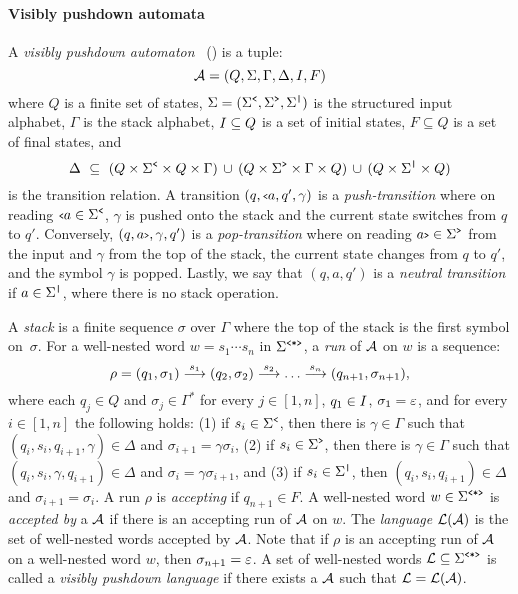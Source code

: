 \paragraph{Visibly pushdown automata} A \emph{visibly pushdown automaton}~\cite{AlurM04} (\vpa) is a tuple:
$$
\mathcal{A} = (Q, \Sigma, \Gamma, \Delta, I, F)
$$ 
where $Q$ is a finite set of states, $\Sigma = (\Sigma^{\texttt{<}}, \Sigma^{\texttt{>}}, \Sigma^{\texttt{|}})$ is the structured input alphabet, $\Gamma$ is the stack alphabet, $I \subseteq Q$ is a set of initial states, $F\subseteq Q$ is a set of final states, and
$$
\Delta \ \subseteq \ (Q\times\opS\times Q\times\Gamma) \,\cup \, (Q\times\clS\times\Gamma\times Q) \, \cup \, (Q\times\noS\times Q)
$$ 
is the transition relation.
A transition $(q,{\scriptsize\texttt{<}} a,q',\gamma)$ is a {\em push-transition} where on reading ${\scriptsize\texttt{<}} a\in\Sigma^{\texttt{<}}$, $\gamma$ is pushed onto the stack and the current state switches from $q$ to $q'$. Conversely, $(q,a{\scriptsize\texttt{>}},\gamma,q')$ is a {\em pop-transition} where on reading $a{\scriptsize\texttt{>}}\in\Sigma^{\texttt{>}}$ from the input and $\gamma$ from the top of the stack, the current state changes from $q$ to $q'$, and the symbol $\gamma$ is popped. Lastly, we say that $(q,a,q')$ is a {\em neutral transition} if $a\in\Sigma^{\texttt{|}}$, where there is no stack operation.

A \emph{stack} is a finite sequence $\sigma$ over $\Gamma$ where the top of the stack is the first symbol on~$\sigma$. For a well-nested word $w = s_1 \cdots s_n$ in $\Sigma^{\texttt{<*>}}$, a \emph{run} of $\mathcal{A}$ on $w$ is a sequence:
$$
\rho = (q_1,\sigma_1) \overset{s_1}{\longrightarrow} (q_2,\sigma_2) \overset{s_2}{\longrightarrow} \ldots \overset{s_n}{\longrightarrow} (q_{n+1},\sigma_{n+1}),
$$ 
where each $q_j \in Q$ and $\sigma_j\in\Gamma^{*}$ for every $j\in[1,n]$, $q_1\in I$, $\sigma_1 = \varepsilon$, and for every $i\in[1,n]$ the following holds: 
(1) if $s_{i}\in\Sigma^{\texttt{<}}$, then there is $\gamma\in\Gamma$ such that $(q_i,s_{i},q_{i+1},\gamma) \in \Delta$ and $\sigma_{i+1} = \gamma\sigma_i$, 
(2) if $s_{i}\in\Sigma^{\texttt{>}}$, then there is $\gamma\in\Gamma$ such that $(q_i,s_{i},\gamma,q_{i+1}) \in \Delta$ and $\sigma_{i} = \gamma\sigma_{i+1}$, and
(3) if $s_{i}\in\Sigma^{\texttt{|}}$, then $(q_i,s_{i},q_{i+1}) \in \Delta$ and $\sigma_{i+1} = \sigma_i$.
A run $\rho$ is \emph{accepting} if $q_{n+1}\in F$. A well-nested word $w\in\Sigma^{\texttt{<*>}}$ is \emph{accepted by} a \vpa $\mathcal{A}$ if there is an accepting run of $\mathcal{A}$ on $w$. The \emph{language} $\mathcal{L}(\mathcal{A})$ is the set of well-nested words accepted by $\mathcal{A}$. Note that if $\rho$ is an accepting run of $\mathcal{A}$ on a well-nested word $w$, then $\sigma_{n+1} = \varepsilon$. A set of well-nested words $\mathcal{L} \subseteq \Sigma^{\texttt{<*>}}$ is called a \emph{visibly pushdown language} if there exists a \vpa $\mathcal{A}$ such that $\mathcal{L} = \mathcal{L}(\mathcal{A})$.

